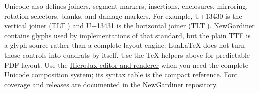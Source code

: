 \documentclass[11pt]{article}
\newcommand{\egypt}[1]{{\leavevmode\textdir TLT\NewGardinerFont #1}}
\begin{document}
Unicode also defines joiners, segment markers, insertions, enclosures,
mirroring, rotation selectors, blanks, and damage markers.  For example,
U+13430 is the vertical joiner (\egypt{𓐰}) and U+13431 is the horizontal
joiner (\egypt{𓐱}).  NewGardiner contains glyphs used by implementations of
that standard, but the plain TTF is a glyph source rather than a complete
layout engine: LuaLaTeX does not turn those controls into quadrats by itself.
Use the TeX helpers above for predictable PDF layout.  Use the
\href{https://nederhof.github.io/hierojax/}{HieroJax editor and renderer} when
you need the complete Unicode composition system; its
\href{https://nederhof.github.io/hierojax/syntax.html}{syntax table} is the
compact reference.  Font coverage and releases are documented in the
\href{https://github.com/nederhof/newgardiner}{NewGardiner repository}.
\end{document}
